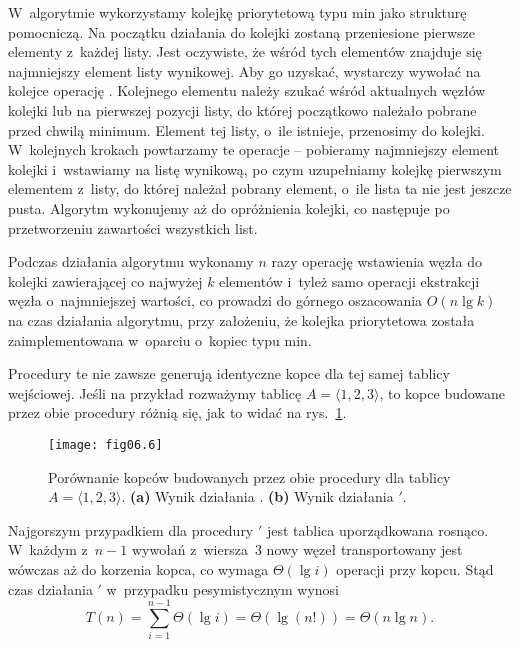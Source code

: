 \exercise %
W~algorytmie wykorzystamy kolejkę priorytetową typu min jako strukturę pomocniczą. Na początku działania do kolejki zostaną przeniesione pierwsze elementy z~każdej listy. Jest oczywiste, że wśród tych elementów znajduje się najmniejszy element listy wynikowej. Aby go uzyskać, wystarczy wywołać na kolejce operację . Kolejnego elementu należy szukać wśród aktualnych węzłów kolejki lub na pierwszej pozycji listy, do której początkowo należało pobrane przed chwilą minimum. Element tej listy, o~ile istnieje, przenosimy do kolejki. W~kolejnych krokach powtarzamy te operacje -- pobieramy najmniejszy element kolejki i~wstawiamy na listę wynikową, po czym uzupełniamy kolejkę pierwszym elementem z~listy, do której należał pobrany element, o~ile lista ta nie jest jeszcze pusta. Algorytm wykonujemy aż do opróżnienia kolejki, co następuje po przetworzeniu zawartości wszystkich list.

Podczas działania algorytmu wykonamy $n$ razy operację wstawienia węzła do kolejki zawierającej co najwyżej $k$ elementów i~tyleż samo operacji ekstrakcji węzła o~najmniejszej wartości, co prowadzi do górnego oszacowania $O(n\lg k)$ na czas działania algorytmu, przy założeniu, że kolejka priorytetowa została zaimplementowana w~oparciu o~kopiec typu min.

\problems


\subproblem %
Procedury te nie zawsze generują identyczne kopce dla tej samej tablicy wejściowej. Jeśli na przykład rozważymy tablicę $A=\langle1,2,3\rangle$, to kopce budowane przez obie procedury różnią się, jak to widać na rys.~\ref{fig:6-1(a)}.
\begin{figure}[ht]
	\begin{center}
		\texttt{[image: fig06.6]}
	\end{center}
	\caption{Porównanie kopców budowanych przez obie procedury dla tablicy $A=\langle1,2,3\rangle$. {\sffamily\bfseries(a)} Wynik działania . {\sffamily\bfseries(b)} Wynik działania $'$.} \label{fig:6-1(a)}
\end{figure}

\subproblem %
Najgorszym przypadkiem dla procedury $'$ jest tablica uporządkowana rosnąco. W~każdym z~$n-1$ wywołań  z~wiersza~3 nowy węzeł transportowany jest wówczas aż do korzenia kopca, co wymaga $\Theta(\lg i)$ operacji przy  kopcu. Stąd czas działania $'$ w~przypadku pesymistycznym wynosi
\[
	T(n) = \sum_{i=1}^{n-1}\Theta(\lg i) = \Theta(\lg(n!)) = \Theta(n\lg n).
\]

